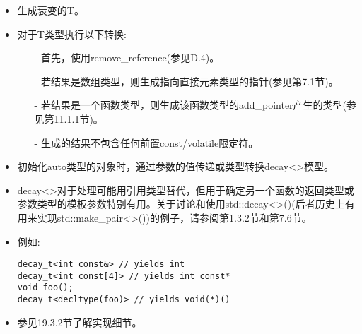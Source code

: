 \begin{itemize}
\item
生成衰变的T。

\item
对于T类型执行以下转换:

\begin{itemize}
\item[-]
首先，使用remove\_reference(参见D.4)。

\item[-]
若结果是数组类型，则生成指向直接元素类型的指针(参见第7.1节)。

\item[-]
若结果是一个函数类型，则生成该函数类型的add\_pointer产生的类型(参见第11.1.1节)。

\item[-]
生成的结果不包含任何前置const/volatile限定符。
\end{itemize}

\item
初始化auto类型的对象时，通过参数的值传递或类型转换decay<>模型。

\item
decay<>对于处理可能用引用类型替代，但用于确定另一个函数的返回类型或参数类型的模板参数特别有用。关于讨论和使用std::decay<>()(后者历史上有用来实现std::make\_pair<>())的例子，请参阅第1.3.2节和第7.6节。

\item
例如:
\begin{lstlisting}[style=styleCXX]
decay_t<int const&> // yields int
decay_t<int const[4]> // yields int const*
void foo();
decay_t<decltype(foo)> // yields void(*)()
\end{lstlisting}

\item
参见19.3.2节了解实现细节。
\end{itemize}















